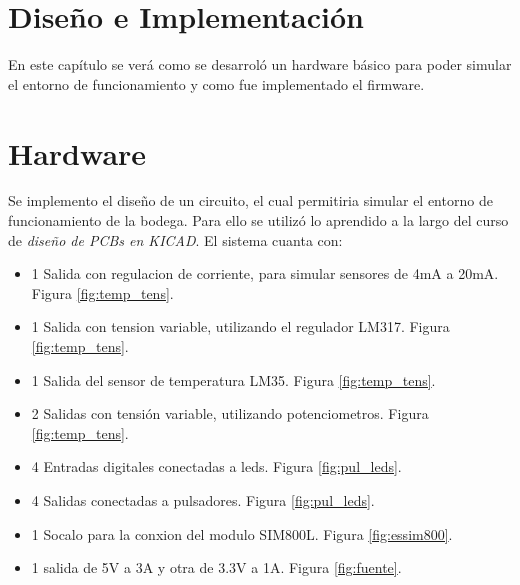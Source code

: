 \section{Diseño e Implementación}
En este capítulo se verá como se desarroló un hardware básico para poder simular el entorno de funcionamiento y como fue implementado el firmware.

\section{Hardware}

Se implemento el diseño de un circuito, el cual permitiria simular el entorno de funcionamiento de la bodega. Para ello se utilizó lo aprendido a la largo del curso de \emph{diseño de PCBs en KICAD}. El sistema cuanta con:
  \begin{itemize}
    \item 1 Salida con regulacion de corriente, para simular sensores de 4mA a 20mA. Figura \ref{fig:temp_tens}.
    \item 1 Salida con tension variable, utilizando el regulador LM317. Figura \ref{fig:temp_tens}.
    \item 1 Salida del sensor de temperatura LM35. Figura \ref{fig:temp_tens}.
    \item 2 Salidas con tensión variable, utilizando potenciometros. Figura \ref{fig:temp_tens}.
    \item 4 Entradas digitales conectadas a leds. Figura \ref{fig:pul_leds}.
    \item 4 Salidas conectadas a pulsadores. Figura \ref{fig:pul_leds}.
    \item 1 Socalo para la conxion del modulo SIM800L. Figura \ref{fig:essim800}.
    \item 1 salida de 5V a 3A y otra de 3.3V a 1A. Figura \ref{fig:fuente}.
  \end{itemize}


